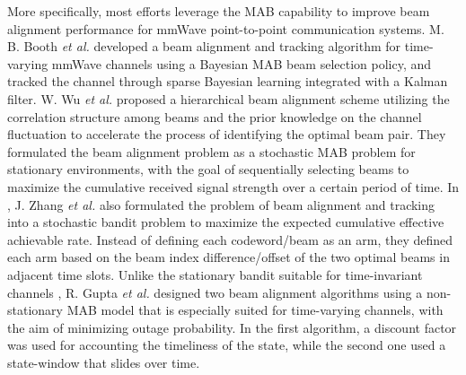 \documentclass[journal,comsoc]{IEEEtran}
\begin{document}
More specifically, most efforts leverage the MAB capability to improve beam alignment performance for mmWave point-to-point communication systems. M. B. Booth \emph{et al.} \cite{Multi-Armed-Bandit-Beam-Alignment-Tracking-2019} developed a beam alignment and tracking algorithm for time-varying mmWave channels using a Bayesian MAB beam selection policy, and tracked the channel through sparse Bayesian learning integrated with a Kalman filter. W. Wu \emph{et al.} \cite{Fast-Beam-Alignment-Correlated-Bandit-2019} proposed a hierarchical beam alignment scheme utilizing the correlation structure among beams and the prior knowledge on the channel fluctuation to accelerate the process  of identifying the optimal beam pair. They formulated the beam alignment problem as a stochastic MAB problem for stationary environments, with the goal of sequentially selecting beams to maximize the cumulative received signal strength over a certain period of time. In \cite{Beam-Alignment-Tracking-Bandit-Learning-2020}, J. Zhang \emph{et al.} also formulated the problem of beam alignment and tracking into a stochastic bandit problem to maximize the expected cumulative effective achievable rate. Instead of defining each codeword/beam as an arm, they defined each arm based on the beam index difference/offset of the two optimal beams in adjacent time slots. Unlike the stationary bandit suitable for time-invariant channels \cite{Fast-Beam-Alignment-Correlated-Bandit-2019,Beam-Alignment-Tracking-Bandit-Learning-2020}, R. Gupta \emph{et al.} \cite{Beam-Alignment-Non-Stationary-Bandits-2020} designed two beam alignment algorithms using a non-stationary MAB model that is especially suited for time-varying channels, with the aim of minimizing outage probability. In the first algorithm, a discount factor was used for accounting the timeliness of the state, while the second one used a state-window that slides over time.
\end{document}
